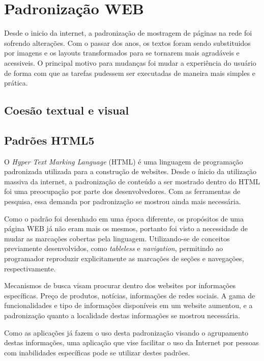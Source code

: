 \documentclass[
	12pt,				%
	oneside,			%
	a4paper,			%
	english,			%
	brazil				%
	]{abntex2ppgsi}
\begin{document}
\chapter{Padronização WEB}

Desde o inicio da internet, a padronização de mostragem de páginas na rede foi sofrendo alterações. Com o passar dos anos, os textos foram sendo substituidos por imagens e os layouts transformados para se tornarem mais agradáveis e acessiveis. O principal motivo para mudanças foi mudar a experiência do usuário de forma com que as tarefas pudessem ser executadas de maneira mais simples e prática. 

 
\section{Coesão textual e visual}

\section{Padrões HTML5}

O \textit{Hyper Text Marking Language} (HTML) é uma linguagem de programação padronizada utilizada para a construção de websites. Desde o ínicio da utilização massiva da internet, a padronização de conteúdo a ser mostrado dentro do HTML foi uma preocupação por parte dos desenvolvedores. Com as ferramentas de pesquisa, essa demanda por padronização se mostrou ainda mais necessária.

Como o padrão foi desenhado em uma época diferente, os propósitos de uma página WEB já não eram mais os mesmos, portanto foi visto a necessidade de mudar as marcações cobertas pela linguagem. Utilizando-se de conceitos previamente desenvolvidos, como \textit{tableless} \cite{tableless} e \textit{navigation}, permitindo ao programador reproduzir explicitamente as marcações de seções e navegações, respectivamente. 

Mecanismos de busca visam procurar dentro dos websites por informações específicas. Preço de produtos, notícias, informações de redes sociais. A gama de funcionalidades e tipo de informações disponíveis em um website aumentou, e a padronização quanto a localidade destas informações se mostrou necessária. 

Como as aplicações já fazem o uso desta padronização visando o agrupamento destas informações, uma aplicação que vise facilitar o uso da Internet por pessoas com inabilidades específicas pode se utilizar destes padrões. 
\end{document}
